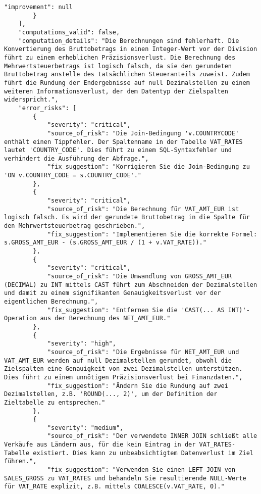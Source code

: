 \begin{lstlisting}[caption={Ausgabe: GEMINI 2.5 Pro Anwendungsfall 5 Robustheitsdurchlauf},label={gemini_case5_prompt3}]
            "improvement": null
        }
    ],
    "computations_valid": false,
    "computation_details": "Die Berechnungen sind fehlerhaft. Die Konvertierung des Bruttobetrags in einen Integer-Wert vor der Division führt zu einem erheblichen Präzisionsverlust. Die Berechnung des Mehrwertsteuerbetrags ist logisch falsch, da sie den gerundeten Bruttobetrag anstelle des tatsächlichen Steueranteils zuweist. Zudem führt die Rundung der Endergebnisse auf null Dezimalstellen zu einem weiteren Informationsverlust, der dem Datentyp der Zielspalten widerspricht.",
    "error_risks": [
        {
            "severity": "critical",
            "source_of_risk": "Die Join-Bedingung 'v.COUNTRYCODE' enthält einen Tippfehler. Der Spaltenname in der Tabelle VAT_RATES lautet 'COUNTRY_CODE'. Dies führt zu einem SQL-Syntaxfehler und verhindert die Ausführung der Abfrage.",
            "fix_suggestion": "Korrigieren Sie die Join-Bedingung zu 'ON v.COUNTRY_CODE = s.COUNTRY_CODE'."
        },
        {
            "severity": "critical",
            "source_of_risk": "Die Berechnung für VAT_AMT_EUR ist logisch falsch. Es wird der gerundete Bruttobetrag in die Spalte für den Mehrwertsteuerbetrag geschrieben.",
            "fix_suggestion": "Implementieren Sie die korrekte Formel: s.GROSS_AMT_EUR - (s.GROSS_AMT_EUR / (1 + v.VAT_RATE))."
        },
        {
            "severity": "critical",
            "source_of_risk": "Die Umwandlung von GROSS_AMT_EUR (DECIMAL) zu INT mittels CAST führt zum Abschneiden der Dezimalstellen und damit zu einem signifikanten Genauigkeitsverlust vor der eigentlichen Berechnung.",
            "fix_suggestion": "Entfernen Sie die 'CAST(... AS INT)'-Operation aus der Berechnung des NET_AMT_EUR."
        },
        {
            "severity": "high",
            "source_of_risk": "Die Ergebnisse für NET_AMT_EUR und VAT_AMT_EUR werden auf null Dezimalstellen gerundet, obwohl die Zielspalten eine Genauigkeit von zwei Dezimalstellen unterstützen. Dies führt zu einem unnötigen Präzisionsverlust bei Finanzdaten.",
            "fix_suggestion": "Ändern Sie die Rundung auf zwei Dezimalstellen, z.B. 'ROUND(..., 2)', um der Definition der Zieltabelle zu entsprechen."
        },
        {
            "severity": "medium",
            "source_of_risk": "Der verwendete INNER JOIN schließt alle Verkäufe aus Ländern aus, für die kein Eintrag in der VAT_RATES-Tabelle existiert. Dies kann zu unbeabsichtigtem Datenverlust im Ziel führen.",
            "fix_suggestion": "Verwenden Sie einen LEFT JOIN von SALES_GROSS zu VAT_RATES und behandeln Sie resultierende NULL-Werte für VAT_RATE explizit, z.B. mittels COALESCE(v.VAT_RATE, 0)."

\end{lstlisting}
